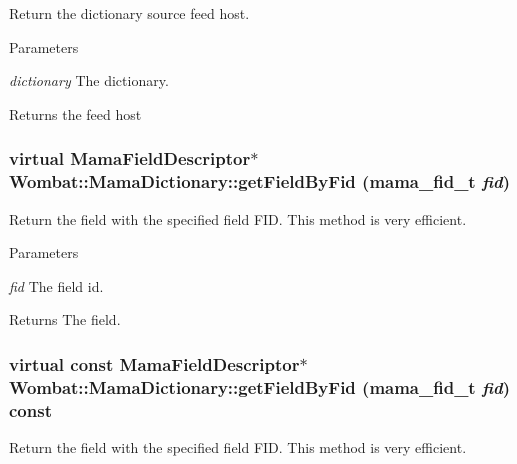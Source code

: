 Return the dictionary source feed host. 
\begin{DoxyParams}{Parameters}
\item[{\em dictionary}]The dictionary. \end{DoxyParams}
\begin{DoxyReturn}{Returns}
the feed host 
\end{DoxyReturn}
\hypertarget{classWombat_1_1MamaDictionary_ada3a8fa9ff039d223d83f5c8396d9b50}{
\subsubsection[{getFieldByFid}]{\setlength{\rightskip}{0pt plus 5cm}virtual {\bf MamaFieldDescriptor}$\ast$ Wombat::MamaDictionary::getFieldByFid (mama\_\-fid\_\-t {\em fid})}}
\label{classWombat_1_1MamaDictionary_ada3a8fa9ff039d223d83f5c8396d9b50}


Return the field with the specified field FID. This method is very efficient.


\begin{DoxyParams}{Parameters}
\item[{\em fid}]The field id. \end{DoxyParams}
\begin{DoxyReturn}{Returns}
The field. 
\end{DoxyReturn}
\hypertarget{classWombat_1_1MamaDictionary_a898677c535dfee775b342651fc898e02}{
\subsubsection[{getFieldByFid}]{\setlength{\rightskip}{0pt plus 5cm}virtual const {\bf MamaFieldDescriptor}$\ast$ Wombat::MamaDictionary::getFieldByFid (mama\_\-fid\_\-t {\em fid}) const}}
\label{classWombat_1_1MamaDictionary_a898677c535dfee775b342651fc898e02}


Return the field with the specified field FID. This method is very efficient.


